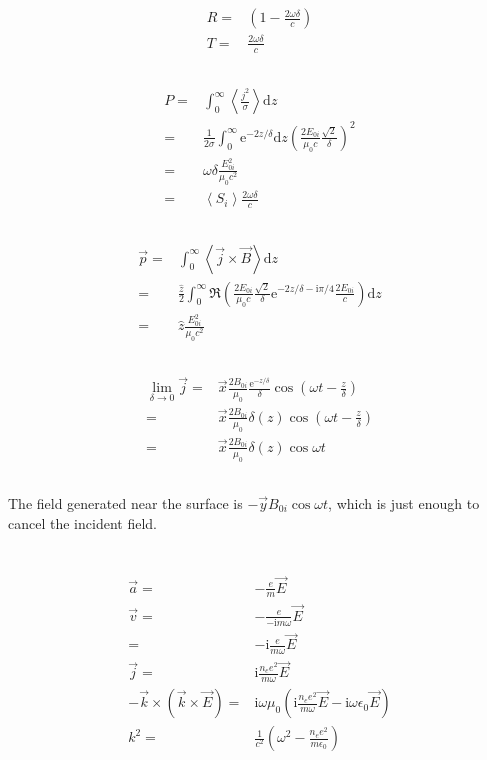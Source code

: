 \documentclass[10pt,fleqn]{article}
\newcommand{\ud}{\mathrm{d}}
\newcommand{\ue}{\mathrm{e}}
\newcommand{\ui}{\mathrm{i}}
\newcommand{\eqar}[1]
{
  \begin{align*}
    #1
  \end{align*}
}
\newcommand{\paren}[1]{{\left({#1}\right)}}
\newcommand{\angl}[1]{{\left\langle{#1}\right\rangle}}
\begin{document}
\subsection{}
\eqar{
  R=&\paren{1-\frac{2\omega\delta}{c}}\\
  T=&\frac{2\omega\delta}{c}
}
\subsection{}
\eqar{
  P=&\int_0^\infty\angl{\frac{j^2}{\sigma}}\ud z\\
  =&\frac{1}{2\sigma}\int_0^\infty\ue^{-2z/\delta}\ud z
  \paren{\frac{2E_{0i}}{\mu_0c}\frac{\sqrt2}{\delta}}^2\\
  =&\omega\delta\frac{E_{0i}^2}{\mu_0c^2}\\
  =&\angl{S_i}\frac{2\omega\delta}{c}
}
\subsection{}
\eqar{
  \vec p=&\int_0^\infty\angl{\vec j\times\vec B}\ud z\\
  =&\frac{\hat z}2\int_0^\infty\Re\paren{\frac{2E_{0i}}{\mu_0c}\frac{\sqrt2}{\delta}
    \ue^{-2z/\delta-\ui\pi/4}
    \frac{2E_{0i}}{c}}\ud z\\
  =&\hat z\frac{E_{0i}^2}{\mu_0 c^2}
}
\subsection{}
\eqar{
  \lim_{\delta\rightarrow0}\vec j=&\vec x\frac{2B_{0i}}{\mu_0}\frac{\ue^{-z/\delta}}{\delta}\cos\paren{\omega t-\frac{z}{\delta}}\\
  =&\vec x\frac{2B_{0i}}{\mu_0}\delta\paren{z}\cos\paren{\omega t-\frac{z}{\delta}}\\
  =&\vec x\frac{2B_{0i}}{\mu_0}\delta\paren{z}\cos{\omega t}
}
\subsection{}
The field generated near the surface is $-\vec yB_{0i}\cos{\omega t}$, which is just enough to cancel the incident field.

\section{}
\subsection{}
\eqar{
  \vec a=&-\frac{e}{m}\vec E\\
  \vec v=&-\frac{e}{-\ui m\omega}\vec E\\
  =&-\ui\frac{e}{m\omega}\vec E\\
  \vec j=&\ui\frac{n_ee^2}{m\omega}\vec E\\
  -\vec k\times\paren{\vec k\times\vec E}=&\ui\omega\mu_0\paren{\ui\frac{n_ee^2}{m\omega}\vec E-\ui\omega\epsilon_0\vec E}\\
  k^2=&\frac{1}{c^2}\paren{\omega^2-\frac{n_ee^2}{m\epsilon_0}}
}
\end{document}
